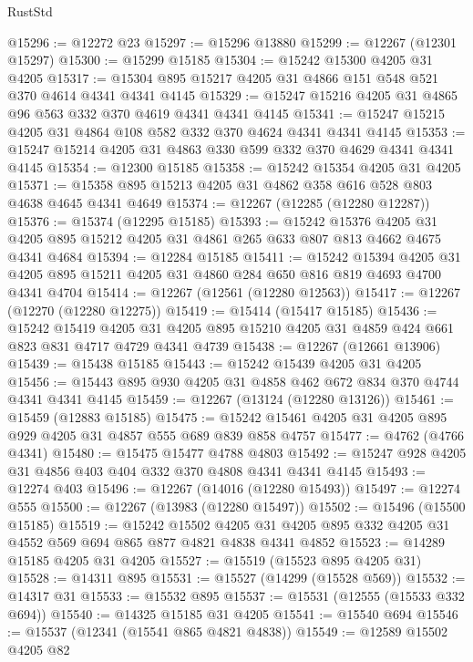 \begin{lexlean}{RustStd}
\begin{coremodule}
@15296 := @12272 @23
@15297 := @15296 @13880
@15299 := @12267 (@12301 @15297)
@15300 := @15299 @15185
@15304 := @15242 @15300 @4205 @31 @4205
@15317 := @15304 @895 @15217 @4205 @31 @4866 @151 @548 @521 @370 @4614 @4341 @4341 @4145
@15329 := @15247 @15216 @4205 @31 @4865 @96 @563 @332 @370 @4619 @4341 @4341 @4145
@15341 := @15247 @15215 @4205 @31 @4864 @108 @582 @332 @370 @4624 @4341 @4341 @4145
@15353 := @15247 @15214 @4205 @31 @4863 @330 @599 @332 @370 @4629 @4341 @4341 @4145
@15354 := @12300 @15185
@15358 := @15242 @15354 @4205 @31 @4205
@15371 := @15358 @895 @15213 @4205 @31 @4862 @358 @616 @528 @803 @4638 @4645 @4341 @4649
@15374 := @12267 (@12285 (@12280 @12287))
@15376 := @15374 (@12295 @15185)
@15393 := @15242
    @15376
    @4205
    @31
    @4205
    @895
    @15212
    @4205
    @31
    @4861
    @265
    @633
    @807
    @813
    @4662
    @4675
    @4341
    @4684
@15394 := @12284 @15185
@15411 := @15242
    @15394
    @4205
    @31
    @4205
    @895
    @15211
    @4205
    @31
    @4860
    @284
    @650
    @816
    @819
    @4693
    @4700
    @4341
    @4704
@15414 := @12267 (@12561 (@12280 @12563))
@15417 := @12267 (@12270 (@12280 @12275))
@15419 := @15414 (@15417 @15185)
@15436 := @15242
    @15419
    @4205
    @31
    @4205
    @895
    @15210
    @4205
    @31
    @4859
    @424
    @661
    @823
    @831
    @4717
    @4729
    @4341
    @4739
@15438 := @12267 (@12661 @13906)
@15439 := @15438 @15185
@15443 := @15242 @15439 @4205 @31 @4205
@15456 := @15443 @895 @930 @4205 @31 @4858 @462 @672 @834 @370 @4744 @4341 @4341 @4145
@15459 := @12267 (@13124 (@12280 @13126))
@15461 := @15459 (@12883 @15185)
@15475 := @15242 @15461 @4205 @31 @4205 @895 @929 @4205 @31 @4857 @555 @689 @839 @858 @4757
@15477 := @4762 (@4766 @4341)
@15480 := @15475 @15477 @4788 @4803
@15492 := @15247 @928 @4205 @31 @4856 @403 @404 @332 @370 @4808 @4341 @4341 @4145
@15493 := @12274 @403
@15496 := @12267 (@14016 (@12280 @15493))
@15497 := @12274 @555
@15500 := @12267 (@13983 (@12280 @15497))
@15502 := @15496 (@15500 @15185)
@15519 := @15242
    @15502
    @4205
    @31
    @4205
    @895
    @332
    @4205
    @31
    @4552
    @569
    @694
    @865
    @877
    @4821
    @4838
    @4341
    @4852
@15523 := @14289 @15185 @4205 @31 @4205
@15527 := @15519 (@15523 @895 @4205 @31)
@15528 := @14311 @895
@15531 := @15527 (@14299 (@15528 @569))
@15532 := @14317 @31
@15533 := @15532 @895
@15537 := @15531 (@12555 (@15533 @332 @694))
@15540 := @14325 @15185 @31 @4205
@15541 := @15540 @694
@15546 := @15537 (@12341 (@15541 @865 @4821 @4838))
@15549 := @12589 @15502 @4205 @82

\end{coremodule}
\end{lexlean}
